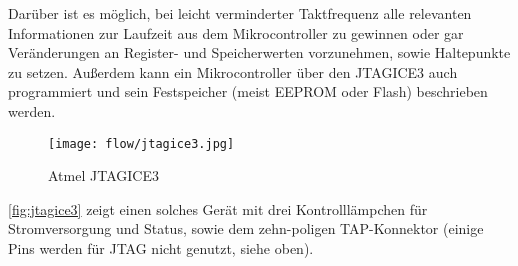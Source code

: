 Darüber ist es möglich, bei leicht verminderter Taktfrequenz alle relevanten Informationen zur Laufzeit aus dem Mikrocontroller zu gewinnen oder gar Veränderungen an Register- und Speicherwerten vorzunehmen, sowie Haltepunkte zu setzen. Außerdem kann ein Mikrocontroller über den JTAGICE3 auch programmiert und sein Festspeicher (meist EEPROM oder Flash) beschrieben werden.

\begin{figure}[!h]
  \centering
    \texttt{[image: flow/jtagice3.jpg]}
    \caption{Atmel JTAGICE3 \cite{AtmelJTAGICE3:2014:Online}}
    \label{fig:jtagice3}
\end{figure}

\autoref{fig:jtagice3} zeigt einen solches Gerät mit drei Kontrolllämpchen für Stromversorgung und Status, sowie dem zehn-poligen TAP-Konnektor (einige Pins werden für JTAG nicht genutzt, siehe oben).